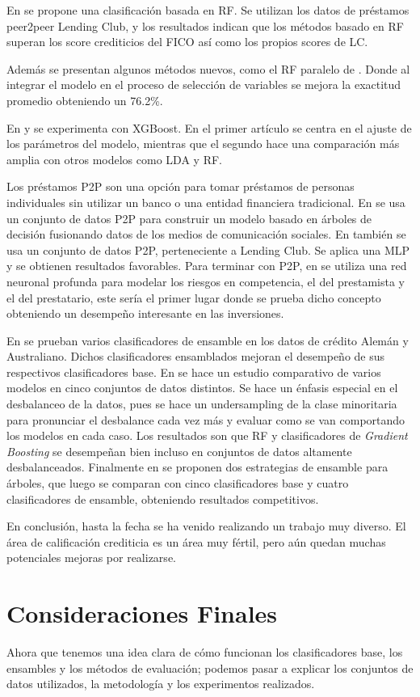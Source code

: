 En \citep{malekipirbazari2015risk} se propone una clasificación basada en \ac{RF}. Se utilizan los datos de préstamos peer2peer Lending Club, y los resultados indican que los métodos basado en \ac{RF} superan los score crediticios del FICO así como los propios scores de LC.

Además se presentan algunos métodos nuevos, como el \ac{RF} paralelo de \citep{van2016novel}. Donde al integrar el modelo en el proceso de selección de variables se mejora la exactitud promedio obteniendo un 76.2\%.

En \citep{xia2017boosted} y \citep{bhatia2017credit} se experimenta con \ac{XGBoost}. En el primer artículo se centra en el ajuste de los parámetros del modelo, mientras que el segundo hace una comparación más amplia con otros modelos como \ac{LDA} y \ac{RF}.

Los préstamos \ac{P2P} son una opción para tomar préstamos de personas individuales sin utilizar un banco o una entidad financiera tradicional. En \citep{zhang2016research} se usa un conjunto de datos \ac{P2P} para construir un modelo basado en árboles de decisión fusionando datos de los medios de comunicación sociales. En \citep{zang2014credit} también se usa un conjunto de datos \ac{P2P}, perteneciente a Lending Club. Se aplica una \ac{MLP} y se obtienen resultados favorables. Para terminar con \ac{P2P}, en \citep{tan2018deep} se utiliza una red neuronal profunda para modelar los riesgos en competencia, el del prestamista y el del prestatario, este sería el primer lugar donde se prueba dicho concepto obteniendo un desempeño interesante en las inversiones.

En \citep{nanni2009experimental} se prueban varios clasificadores de ensamble en los datos de crédito Alemán y Australiano. Dichos clasificadores ensamblados mejoran el desempeño de sus respectivos clasificadores base. En \citep{brown2012experimental} se hace un estudio comparativo de varios modelos en cinco conjuntos de datos distintos. Se hace un énfasis especial en el desbalanceo de la datos, pues se hace un undersampling de la clase minoritaria para pronunciar el desbalance cada vez más y evaluar como se van comportando los modelos en cada caso. Los resultados son que \ac{RF} y clasificadores de \textit{Gradient Boosting} se desempeñan bien incluso en conjuntos de datos altamente desbalanceados. Finalmente en \citep{wang2012two} se proponen dos estrategias de ensamble para árboles, que luego se comparan con cinco clasificadores base y cuatro clasificadores de ensamble, obteniendo resultados competitivos.

En conclusión, hasta la fecha se ha venido realizando un trabajo muy diverso. El área de calificación crediticia es un área muy fértil, pero aún quedan muchas potenciales mejoras por realizarse.

\section{Consideraciones Finales}

Ahora que tenemos una idea clara de cómo funcionan los clasificadores base, los ensambles y los métodos de evaluación; podemos pasar a explicar los conjuntos de datos utilizados, la metodología y los experimentos realizados.
